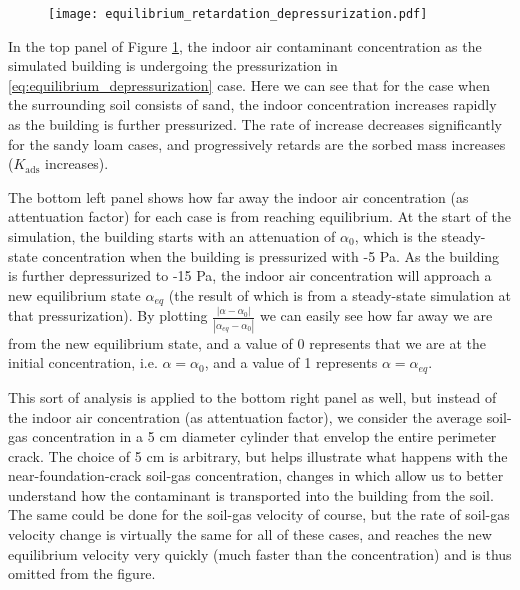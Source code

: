 \begin{figure}[!htb]
  \texttt{[image: equilibrium\_retardation\_depressurization.pdf]}
  \caption{}
  \label{fig:equilibrium_depressurization}
\end{figure}

In the top panel of Figure \ref{fig:equilibrium_depressurization}, the indoor air contaminant concentration as the simulated building is undergoing the pressurization in \eqref{eq:equilibrium_depressurization} case.
Here we can see that for the case when the surrounding soil consists of sand, the indoor concentration increases rapidly as the building is further pressurized.
The rate of increase decreases significantly for the sandy loam cases, and progressively retards are the sorbed mass increases ($K_\mathrm{ads}$ increases).\par

The bottom left panel shows how far away the indoor air concentration (as attentuation factor) for each case is from reaching equilibrium.
At the start of the simulation, the building starts with an attenuation of $\alpha_0$, which is the steady-state concentration when the building is pressurized with -5 Pa.
As the building is further depressurized to -15 Pa, the indoor air concentration will approach a new equilibrium state $\alpha_{eq}$ (the result of which is from a steady-state simulation at that pressurization).
By plotting $\frac{|\alpha-\alpha_0|}{|\alpha_{eq}-\alpha_0|}$ we can easily see how far away we are from the new equilibrium state, and a value of 0 represents that we are at the initial concentration, i.e. $\alpha = \alpha_0$, and a value of 1 represents $\alpha = \alpha_{eq}$.\par

This sort of analysis is applied to the bottom right panel as well, but instead of the indoor air concentration (as attentuation factor), we consider the average soil-gas concentration in a 5 cm diameter cylinder that envelop the entire perimeter crack.
The choice of 5 cm is arbitrary, but helps illustrate what happens with the near-foundation-crack soil-gas concentration, changes in which allow us to better understand how the contaminant is transported into the building from the soil.
The same could be done for the soil-gas velocity of course, but the rate of soil-gas velocity change is virtually the same for all of these cases, and reaches the new equilibrium velocity very quickly (much faster than the concentration) and is thus omitted from the figure.\par


